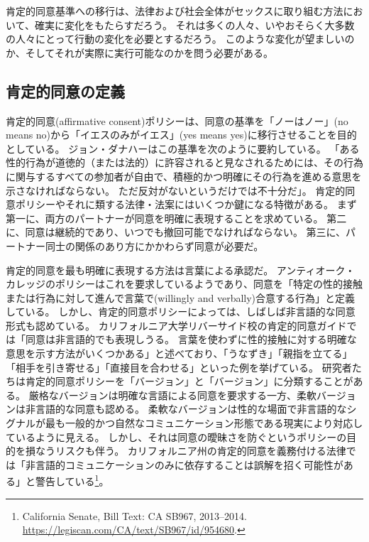 \documentclass[paper=a4,book,openany]{jlreq} \usepackage{mystyle}
\begin{document}
肯定的同意基準への移行は、法律および社会全体がセックスに取り組む方法において、確実に変化をもたらすだろう。
それは多くの人々、いやおそらく大多数の人々にとって行動の変化を必要とするだろう。
このような変化が望ましいのか、そしてそれが実際に実行可能なのかを問う必要がある。

\subsection{肯定的同意の定義}

肯定的同意(affirmative consent)ポリシーは、同意の基準を「ノーはノー」(no means no)から「イエスのみがイエス」(yes means yes)に移行させることを目的としている。
ジョン・ダナハーはこの基準を次のように要約している。
「ある性的行為が道徳的（または法的）に許容されると見なされるためには、その行為に関与するすべての参加者が自由で、積極的かつ明確にその行為を進める意思を示さなければならない。
ただ反対がないというだけでは不十分だ」\citep{danaher14:_yes_means_yes}。
肯定的同意ポリシーやそれに類する法律・法案にはいくつか鍵になる特徴がある。
まず第一に、両方のパートナーが同意を明確に表現することを求めている。
第二に、同意は継続的であり、いつでも撤回可能でなければならない。
第三に、パートナー同士の関係のあり方にかかわらず同意が必要だ。

肯定的同意を最も明確に表現する方法は言葉による承認だ。
アンティオーク・カレッジのポリシーはこれを要求しているようであり、同意を「特定の性的接触または行為に対して進んで言葉で(willingly and verbally)合意する行為」と定義している\citep{college25:_sexual_offen_preven_polic}。
しかし、肯定的同意ポリシーによっては、しばしば非言語的な同意形式も認めている。
カリフォルニア大学リバーサイド校の肯定的同意ガイドでは「同意は非言語的でも表現しうる。
言葉を使わずに性的接触に対する明確な意思を示す方法がいくつかある」と述べており、「うなずき」「親指を立てる」「相手を引き寄せる」「直接目を合わせる」といった例を挙げている\citep{university25:_what_is_consen}。
研究者たちは肯定的同意ポリシーを「バージョン」と「バージョン」に分類することがある。
厳格なバージョンは明確な言語による同意を要求する一方、柔軟バージョンは非言語的な同意も認める。
柔軟なバージョンは性的な場面で非言語的なシグナルが最も一般的かつ自然なコミュニケーション形態である現実により対応しているように見える。
しかし、それは同意の曖昧さを防ぐというポリシーの目的を損なうリスクも伴う。
カリフォルニア州の肯定的同意を義務付ける法律では「非言語的コミュニケーションのみに依存することは誤解を招く可能性がある」と警告している\footnote{California Senate, Bill Text: CA SB967, 2013--2014. \url{https://legiscan.com/CA/text/SB967/id/954680}.}。
\end{document}
